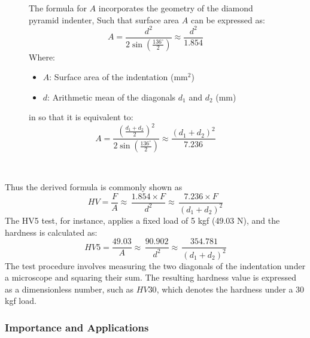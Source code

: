 \documentclass{article}
\begin{document}
\begin{figure}[H]
\begin{minipage}{0.51\textwidth}
\begin{itemize}[itemsep=-1mm]
            \end{itemize}
            The formula for $A$ incorporates the geometry of the diamond pyramid indenter, 
            Such that surface area \(A\) can be expressed as:
            \begin{equation}
                A = \frac{d^2}{2\sin\left(\frac{136^\circ}{2}\right)} \approx \frac{d^2}{1.854} 
            \end{equation}
            Where:  
            \begin{itemize}[itemsep=-1mm]
                \item \(A\): Surface area of the indentation (mm\(^2\))
                \item \(d\): Arithmetic mean of the diagonals \(d_1\) and \(d_2\) (mm)
            \end{itemize}
            in so that it is equivalent to:
            \begin{equation}
                    A= \frac{\left(\frac{d_1+d_2}{2}\right)^2}{2\sin\left(\frac{136^\circ}{2}\right)} \approx \frac{\left(d_1 + d_2\right)^2}{7.236}
            \end{equation}
        \end{minipage}\\
    \end{figure}
    \vspace{-0.1em}\noindent
    Thus the derived formula is commonly shown as
    \begin{equation}
        \boxed{HV = \frac{F}{A} \approx \, \frac{1.854 \times F}{d^2} \approx \, \frac{7.236\times F}{\left(d_1 + d_2\right)^2}}    
    \end{equation} 
    The HV5 test, for instance, applies a fixed load of 5 kgf (49.03 N), and the hardness is calculated as:  
    \begin{equation}
        HV5 = \frac{49.03}{A} \approx \, \frac{90.902}{d^2} \approx \, \frac{354.781}{\left(d_1 + d_2\right)^2}
    \end{equation}
    The test procedure involves measuring the two diagonals of the indentation under a microscope and squaring their sum. The resulting hardness value is expressed as a dimensionless number, such as \(HV30\), which denotes the hardness under a 30 kgf load.  

\subsubsection*{Importance and Applications}  
\end{document}
